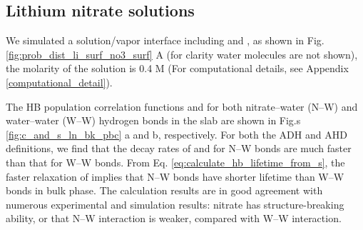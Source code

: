 \subsection{Lithium nitrate solutions} \label{PARAGRAPH_LINO3}
%
%
We simulated a solution/vapor interface including \Li and \nitrate, as shown in Fig.\thinspace\ref{fig:prob_dist_li_surf_no3_surf} A 
(for clarity water molecules are not shown), the \LiN molarity of the solution is 0.4 M 
(For computational details, see Appendix \ref{computational_detail}).

The HB population correlation functions \CHB and \SHB for both nitrate--water (N--W) and water--water (W--W) hydrogen bonds 
in the slab are shown in Fig.s \ref{fig:c_and_s_ln_bk_pbc} a and b, respectively.
For both the ADH and AHD definitions, we find that the decay rates of \CHB and \SHB for N--W bonds are much faster 
than that for W--W bonds. From Eq. \ref{eq:calculate_hb_lifetime_from_s}, the faster relaxation of \SHB implies that 
N--W bonds have shorter lifetime than W--W bonds in bulk phase. 
The calculation results are in good agreement with numerous experimental and simulation results\cite{Salvador2003,Vrbka2004,Tongraar2006,Otten2007}: 
nitrate has structure-breaking ability, or that N--W interaction is weaker, compared with W--W interaction.

